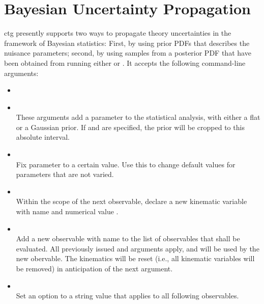 \section{Bayesian Uncertainty Propagation}
\label{sec:usage:ctg-propagate-uncertainty}

ctg presently supports two ways to propagate theory uncertainties in the
framework of Bayesian statistics: First, by using prior PDFs that describes
the nuisance parameters; second, by using samples from a posterior PDF that
have been obtained from running either  or
. It accepts the following command-line arguments:
\begin{itemize}
    \item[] \\[-3\medskipamount]
    \item[] \\[\medskipamount]
        These arguments add a parameter to the statistical analysis, with
        either a flat or a Gaussian prior. If  and
         are specified, the prior will be cropped to this
        absolute interval.

    \item[] \\[\medskipamount]
      Fix parameter to a certain value. Use this to change default values for
      parameters that are not varied.

    \item[] \\[\medskipamount]
        Within the scope of the next observable, declare a new kinematic
        variable with name  and numerical value .

    \item[] \\[\medskipamount]
        Add a new observable with name  to the list of observables
        that shall be evaluated. All previously issued 
        and  arguments apply, and will be used by the new obervable.
        The kinematics will be reset (i.e., all kinematic variables will be removed)
        in anticipation of the next  argument.

    \item[] \\[\medskipamount]
        Set an option to a string value that applies to all following observables.


\end{itemize}
